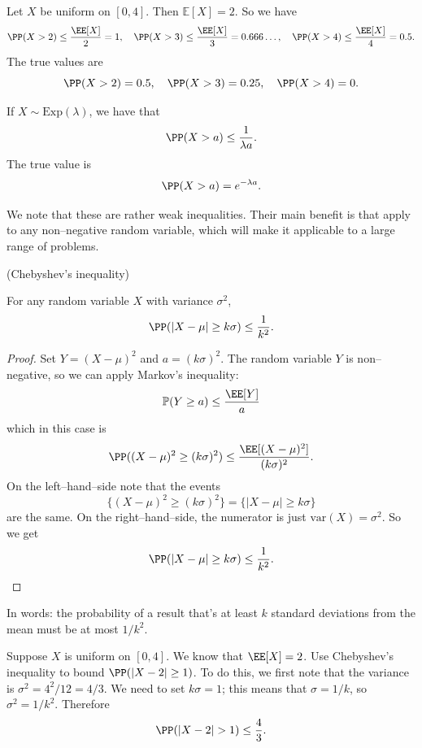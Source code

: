 \documentclass{ximera}
\begin{document}
\begin{example}
Let $X$ be uniform on $[0,4]$. Then $\mathbb{E}[X]=2$. So we have
$$
\PP(X > 2 ) \leq \frac{\EE[X]}{2} = 1, \quad \PP(X > 3) \leq \frac{\EE[X]}{3}=0.666\ldots, \quad \PP(X > 4 ) \leq \frac{\EE[X]}{4}=0.5.
$$
The true values are
$$
\PP(X > 2 ) =0.5 , \quad \PP(X > 3) =0.25, \quad \PP(X > 4 ) =0.
$$
\end{example}

\begin{example}
If $X \sim \mathrm{Exp}(\lambda)$, we have that 
$$
\PP( X > a) \leq \frac{1}{\lambda a}.
$$
The true value is 
$$
\PP(X > a ) = e^{-\lambda a}.
$$
\end{example}

We note that these are rather weak inequalities. Their main benefit is that apply to any non--negative random variable, which will make it applicable to a large range of problems. 

\begin{theorem}
(Chebyshev's inequality)

For any random variable $X$ with variance $\sigma^2$,
$$
\PP( \vert X - \mu \vert \geq k\sigma ) \leq \frac{1}{k^2}.
$$
\end{theorem}
\begin{proof}
Set $Y=(X-\mu)^2$ and $a = (k\sigma)^2$. The random variable $Y$ is non--negative, so we can apply Markov's inequality:
$$
\mathbb{P}( Y \geq a ) \leq \frac{ \EE[Y]}{a}
$$
which in this case is
$$
\PP( (X-\mu)^2 \geq (k\sigma)^2) \leq \frac{\EE[ (X-\mu)^2]}{ (k\sigma)^2}.
$$
On the left--hand--side note that the events
$$
\{  (X-\mu)^2 \geq (k\sigma)^2  \} = \{  \vert X - \mu \vert \geq k\sigma \}
$$
are the same. On the right--hand--side, the numerator is just $\mathrm{var}(X) = \sigma^2$. So we get
$$
\PP( \vert X - \mu \vert \geq k\sigma ) \leq \frac{1}{k^2}.
$$
\end{proof}
In words: the probability of a result that's at least $k$ standard deviations from the mean must be at most $1/k^2$.

\begin{example}
Suppose $X$ is uniform on $[0,4]$. We know that $\EE[X]=2$. Use Chebyshev's inequality to bound $\PP( \vert X -2 \vert \geq 1)$.
To do this, we first note that the variance is $\sigma^2=4^2/12=4/3$. We need to set $k\sigma = 1$; this means that $\sigma = 1/k$, so $\sigma^2 = 1/k^2$. Therefore
$$
\PP( \vert X - 2 \vert > 1 ) \leq \frac{4}{3}.
$$
\end{example}
\end{document}

